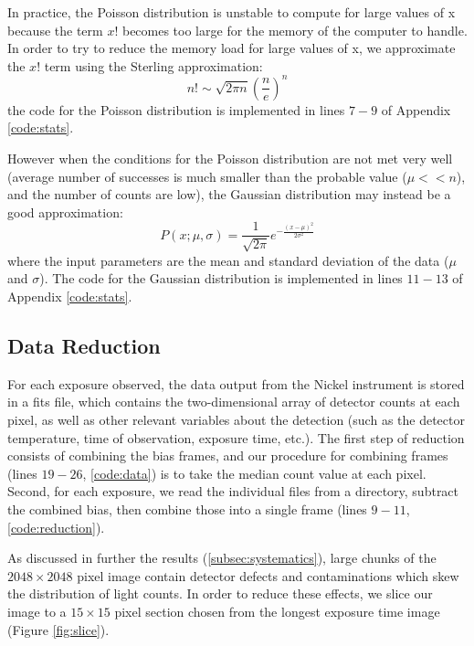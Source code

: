 \documentclass[preprint]{aastex62}
\begin{document}
In practice, the Poisson distribution is unstable to compute for large values of x because the term $x!$ becomes too large for the memory of the computer to handle. In order to try to reduce the memory load for large values of x, we approximate the $x!$ term using the Sterling approximation:
\begin{equation}
n! \sim \sqrt{2\pi n}\left(\frac{n}{e} \right)^n
\end{equation}
the code for the Poisson distribution is implemented in lines $7-9$ of Appendix \ref{code:stats}.

However when the conditions for the Poisson distribution are not met very well (average number of successes is much smaller than the probable value ($\mu << n$), and the number of counts are low), the Gaussian distribution may instead be a good approximation:
\begin{equation}
P(x; \mu, \sigma) = \frac{1}{\sqrt{2\pi}} e^{-\frac{(x-\mu)^2}{2\sigma^2}}
\end{equation}
where the input parameters are the mean and standard deviation of the data ($\mu$ and $\sigma$). The code for the Gaussian distribution is implemented in lines $11-13$ of Appendix \ref{code:stats}. 

\subsection{Data Reduction} \label{sec:reduction}
For each exposure observed, the data output from the Nickel instrument is stored in a fits file, which contains the two-dimensional array of detector counts at each pixel, as well as other relevant variables about the detection (such as the detector temperature, time of observation, exposure time, etc.). The first step of reduction consists of combining the bias frames, and our procedure for combining frames (lines $19-26$, \ref{code:data}) is to take the median count value at each pixel. Second, for each exposure, we read the individual files from a directory, subtract the combined bias, then combine those into a single frame (lines $9-11$, \ref{code:reduction}).

As discussed in further the results (\ref{subsec:systematics}), large chunks of the $2048\times2048$ pixel image contain detector defects and contaminations which skew the distribution of light counts. In order to reduce these effects, we slice our image to a $15\times15$ pixel section chosen from the longest exposure time image (Figure \ref{fig:slice}).
\end{document}
